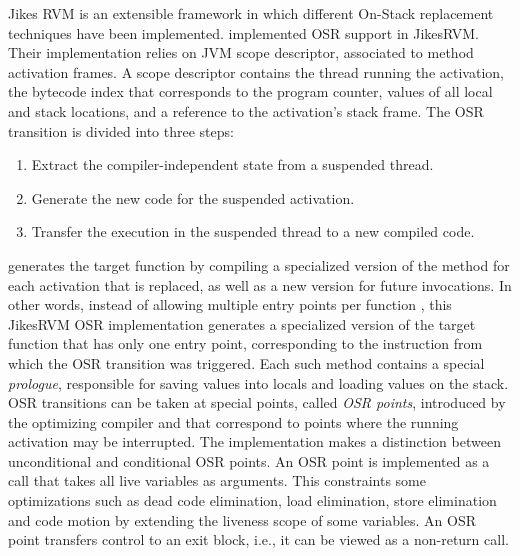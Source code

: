 Jikes RVM is an extensible framework in which different On-Stack replacement techniques have been implemented.
 implemented OSR support in JikesRVM. 
Their implementation relies on JVM scope descriptor, associated to method activation frames.
A scope descriptor contains the thread running the activation, the bytecode index that corresponds to the program counter, values of all local and stack locations, and a reference to the activation's stack frame.
The OSR transition is divided into three steps: 
\begin{enumerate}
    \item Extract the compiler-independent state from a suspended thread. 
    \item Generate the new code for the suspended activation.
    \item Transfer the execution in the suspended thread to a new compiled code.
\end{enumerate}
 generates the target function by compiling a specialized version of the method for each activation that is replaced, as well as a new version for future invocations.
In other words, instead of allowing multiple entry points per function \cite{lameed2013modular, paleczny2001java}, this JikesRVM OSR implementation generates a specialized version of the target function that has only one entry point, corresponding to the instruction from which the OSR transition was triggered.
Each such method contains a special \textit{prologue}, responsible for saving values into locals and loading values on the stack.
OSR transitions can be taken at special points, called \textit{OSR points}, introduced by the optimizing compiler and that correspond to points where the running activation may be interrupted.
The implementation makes a distinction between unconditional and conditional OSR points.
An OSR point is implemented as a call that takes all live variables as arguments. 
This constraints some optimizations such as dead code elimination, load elimination, store elimination and code motion by extending the liveness scope of some variables.
An OSR point transfers control to an exit block, i.e., it can be viewed as a non-return call.\\

